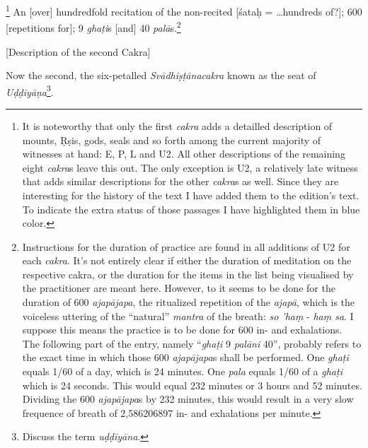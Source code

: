 \begin{otherlanguage}{english}
\begin{tlate}
    \footnote{It is noteworthy that only the first \textit{cakra} adds a detailled description of mounts, Ṛṣis, gods, seals and so forth among the current majority of witnesses at hand: E, P, L and U2. All other descriptions of the remaining eight \textit{cakra}s leave this out. The only exception is U2, a relatively late witness that adds similar descriptions for the other \textit{cakra}s as well. Since they are interesting for the history of the text I have added them to the edition's text. To indicate the extra status of those passages I have highlighted them in blue color.} An [over] hundredfold recitation of the non-recited [śataḥ = \ldots hundreds of?];  600 [repetitions for]; 9 \textit{ghaṭi}s [and] 40 \textit{palā}s.\footnote{Instructions for the duration of practice are found in all additions of U2 for each \textit{cakra}. It's not entirely clear if either the duration of meditation on the respective cakra, or the duration for the items in the list being visualised by the practitioner are meant here. However, to it seems to be done for the duration of 600 \textit{ajapājapa}, the ritualized repetition of the \textit{ajapā}, which is the voiceless uttering of the ``natural'' \textit{mantra} of the breath: \textit{so 'haṃ} - \textit{haṃ sa}. I suppose this means the practice is to be done for 600 in- and exhalations. The following part of the entry, namely ``\textit{ghaṭi} 9 \textit{palāni} 40'', probably refers to the exact time in which those 600 \textit{ajapājapa}s shall be performed. One \textit{ghaṭi} equals 1/60 of a day, which is 24 minutes. One \textit{pala} equals 1/60 of a \textit{ghaṭi} which is 24 seconds. This would equal 232 minutes or 3 hours and 52 minutes. Dividing the 600 \textit{ajapājapa}s by 232 minutes, this would result in a very slow frequence of breath of 2,586206897 in- and exhalations per minute.}
  \end{tlate}
      \bigskip
    \centerline{\textrm{\small{[Description of the second Cakra]}}}
    \bigskip
    \begin{tlate}
      Now the second, the six-petalled \textit{Svādhiṣṭānacakra} known as the seat of \textit{Uḍḍīyāṇa}\footnote{Discuss the term \textit{uḍḍīyāna}.}.
    \end{tlate}
    \begin{tlate}

\end{tlate}
\end{otherlanguage}

